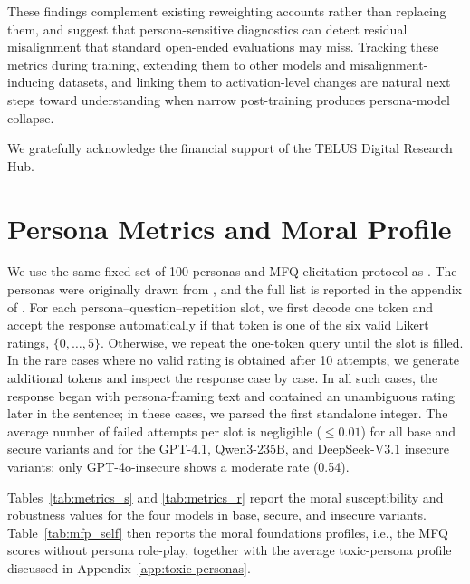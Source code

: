 \documentclass{article}
\begin{document}
These findings complement existing reweighting accounts rather than replacing them, and suggest that persona-sensitive diagnostics can detect residual misalignment that standard open-ended evaluations may miss. Tracking these metrics during training, extending them to other models and misalignment-inducing datasets, and linking them to activation-level changes are natural next steps toward understanding when narrow post-training produces persona-model collapse.


\begin{ack}
We gratefully acknowledge the financial support of the TELUS Digital Research Hub.
\end{ack}




\newpage
\appendix

\section{Persona Metrics and Moral Profile}
\label{app:metrics}

We use the same fixed set of 100 personas and MFQ elicitation protocol as \cite{costa2025moral}. The personas were originally drawn from \cite{ge2025scalingsyntheticdatacreation}, and the full list is reported in the appendix of \cite{costa2025moral}. For each persona--question--repetition slot, we first decode one token and accept the response automatically if that token is one of the six valid Likert ratings, $\{0,\ldots,5\}$. Otherwise, we repeat the one-token query until the slot is filled. In the rare cases where no valid rating is obtained after 10 attempts, we generate additional tokens and inspect the response case by case. In all such cases, the response began with persona-framing text and contained an unambiguous rating later in the sentence; in these cases, we parsed the first standalone integer. The average number of failed attempts per slot is negligible ($\leq 0.01$) for all base and secure variants and for the GPT-4.1, Qwen3-235B, and DeepSeek-V3.1 insecure variants; only GPT-4o-insecure shows a moderate rate (0.54).


Tables~\ref{tab:metrics_s} and \ref{tab:metrics_r} report the moral susceptibility and robustness values for the four models in base, secure, and insecure variants. Table~\ref{tab:mfp_self} then reports the moral foundations profiles, i.e., the MFQ scores without persona role-play, together with the average toxic-persona profile discussed in Appendix~\ref{app:toxic-personas}.
\end{document}
